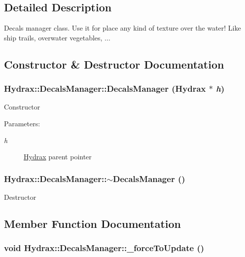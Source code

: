\subsection{Detailed Description}
Decals manager class. Use it for place any kind of texture over the water! Like ship trails, overwater vegetables, ... 

\subsection{Constructor \& Destructor Documentation}
\hypertarget{class_hydrax_1_1_decals_manager_41573a26944436e790cc4f9914caf065}{
\subsubsection[{DecalsManager}]{\setlength{\rightskip}{0pt plus 5cm}Hydrax::DecalsManager::DecalsManager ({\bf Hydrax} $\ast$ {\em h})}}
\label{class_hydrax_1_1_decals_manager_41573a26944436e790cc4f9914caf065}


Constructor \begin{Desc}
\item[Parameters:]
\begin{description}
\item[{\em h}]\hyperlink{class_hydrax_1_1_hydrax}{Hydrax} parent pointer \end{description}
\end{Desc}
\hypertarget{class_hydrax_1_1_decals_manager_d54dbfb7a088d551c83abd3e49853aea}{
\subsubsection[{$\sim$DecalsManager}]{\setlength{\rightskip}{0pt plus 5cm}Hydrax::DecalsManager::$\sim$DecalsManager ()}}
\label{class_hydrax_1_1_decals_manager_d54dbfb7a088d551c83abd3e49853aea}


Destructor 

\subsection{Member Function Documentation}
\hypertarget{class_hydrax_1_1_decals_manager_b3ffe8faa2c0f00ef738d7e7ce493aed}{
\subsubsection[{\_\-forceToUpdate}]{\setlength{\rightskip}{0pt plus 5cm}void Hydrax::DecalsManager::\_\-forceToUpdate ()}}
\label{class_hydrax_1_1_decals_manager_b3ffe8faa2c0f00ef738d7e7ce493aed}



